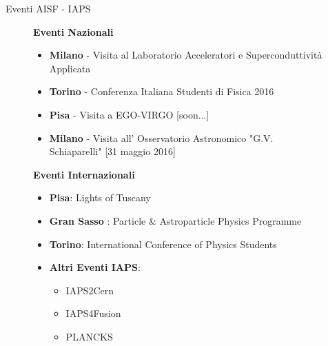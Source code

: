 \documentclass{Bredelebeamer}
\begin{document}
\begin{frame}{Eventi AISF - IAPS}
\begin{figure}
\begin{block}{\centering \textbf{Eventi Nazionali}}
\begin{itemize}
\item \textbf{{Milano}} - Visita al Laboratorio Acceleratori e Superconduttività Applicata
\item \textbf{{Torino}} - Conferenza Italiana Studenti di Fisica 2016
\item \textbf{{Pisa}} - Visita a EGO-VIRGO [soon...]
\item \textbf{{Milano}} - Visita all' Osservatorio Astronomico "G.V. Schiaparelli" [31 maggio 2016] 
\end{itemize}
\end{block}
\begin{block}{\centering \textbf{Eventi Internazionali}}
\begin{itemize}
\item \textbf{Pisa}: Lights of Tuscany
\item \textbf{Gran Sasso} : Particle \& Astroparticle Physics Programme
\item \textbf{Torino}: International Conference of Physics Students
\item \textbf{Altri Eventi IAPS}:
	\begin{itemize}
	\item IAPS2Cern
	\item IAPS4Fusion
	\item PLANCKS
	\end{itemize}
\end{itemize}
\end{block}
\end{figure}
\end{frame}
\end{document}
